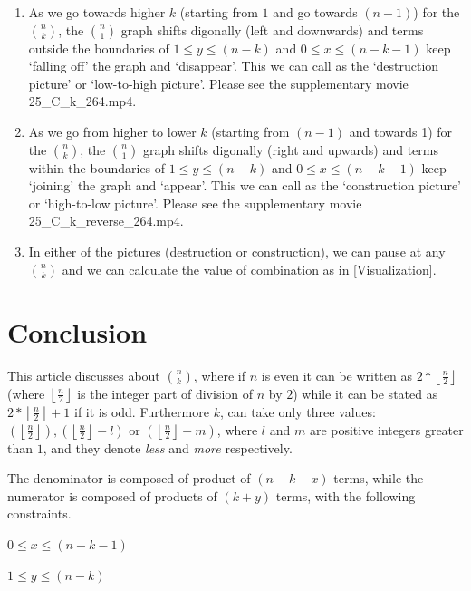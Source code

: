 \documentclass[10pt, twoside]{article}
\newcommand*{\Combination}[2]{\binom{#1}{#2}}%
\newcommand{\floordivision}[2]{\left\lfloor \frac{#1}{#2} \right\rfloor}
\begin{document}
\begin{enumerate}
	\item As we go towards higher $k$ (starting from $1$ and go towards $(n-1)$) for the $\Combination{n}{k}$, the $\Combination{n}{1}$ graph shifts digonally (left and downwards) and terms outside the boundaries of $ 1 \leq y \leq (n-k)$ and $0 \leq x \leq (n-k-1)$ keep `falling off' the graph and `disappear'. This we can call as the `destruction picture' or `low-to-high picture'. Please see the supplementary movie 25\_C\_k\_264.mp4.
	\item As we go from higher to lower $k$ (starting from $(n-1)$ and towards 1) for the $\Combination{n}{k}$, the $\Combination{n}{1}$ graph shifts digonally (right and upwards) and terms within the boundaries of $ 1 \leq y \leq (n-k)$ and $0 \leq x \leq (n-k-1)$ keep `joining' the graph and `appear'. This we can call as the `construction picture' or `high-to-low picture'. Please see the supplementary movie 25\_C\_k\_reverse\_264.mp4.
	\item In either of the pictures (destruction or construction), we can pause at any $\Combination{n}{k}$ and we can calculate the value of combination as in \ref{Visualization}.
	\end{enumerate} 
\section{Conclusion}\label{Summary}
This article discusses about $\Combination{n}{k}$, where if $n$ is even it can be written as $2*\floordivision{n}{2}$ (where $\floordivision{n}{2}$ is the integer part of division of $n$ by $2$) while it can be stated as $2*\floordivision{n}{2}+1$ if it is odd. Furthermore $k$, can take only three values: $(\floordivision{n}{2}), (\floordivision{n}{2} - l) \text{ or } (\floordivision{n}{2} + m)$, where $l$ and $m$ are positive integers greater than $1$, and they denote \textit{less} and \textit{more} respectively.

The denominator is composed of product of $(n-k-x)$ terms, while the numerator is composed of products of $(k+y)$ terms, with the following constraints.

$0 \leq x \leq (n-k-1)$

$1 \leq y \leq (n-k)$
\end{document}
